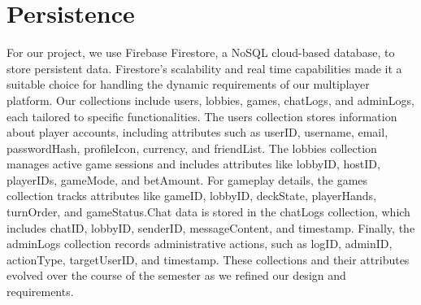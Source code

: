 \clearpage
\section{Persistence}
For our project, we use Firebase Firestore, a NoSQL cloud-based database, to store persistent data. Firestore’s scalability and real time capabilities made it a suitable choice for handling the dynamic requirements of our multiplayer platform. Our collections include users, lobbies, games, chatLogs, and adminLogs, each tailored to specific functionalities. The users collection stores information about player accounts, including attributes such as userID, username, email, passwordHash, profileIcon, currency, and friendList. The lobbies collection manages active game sessions and includes attributes like lobbyID, hostID, playerIDs, gameMode, and betAmount. For gameplay details, the games collection tracks attributes like gameID, lobbyID, deckState, playerHands, turnOrder, and gameStatus.Chat data is stored in the chatLogs collection, which includes chatID, lobbyID, senderID, messageContent, and timestamp. Finally, the adminLogs collection records administrative actions, such as logID, adminID, actionType, targetUserID, and timestamp. These collections and their attributes evolved over the course of the semester as we refined our design and requirements.